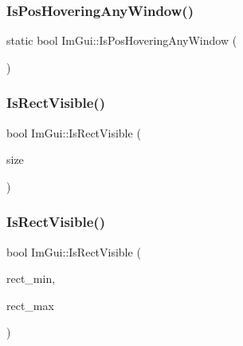 \subsubsection{\texorpdfstring{Is\+Pos\+Hovering\+Any\+Window()}{IsPosHoveringAnyWindow()}}
{\footnotesize\ttfamily static bool Im\+Gui\+::\+Is\+Pos\+Hovering\+Any\+Window (\begin{DoxyParamCaption}\item[{const \hyperlink{struct_im_vec2}{Im\+Vec2} \&}]{ }\end{DoxyParamCaption})\hspace{0.3cm}{\ttfamily [static]}}

\hypertarget{namespace_im_gui_a578ead6237b3ed05497ed361f18d9f97}{}\label{namespace_im_gui_a578ead6237b3ed05497ed361f18d9f97} 
\subsubsection{\texorpdfstring{Is\+Rect\+Visible()}{IsRectVisible()}\hspace{0.1cm}{\footnotesize\ttfamily [1/2]}}
{\footnotesize\ttfamily bool Im\+Gui\+::\+Is\+Rect\+Visible (\begin{DoxyParamCaption}\item[{const \hyperlink{struct_im_vec2}{Im\+Vec2} \&}]{size }\end{DoxyParamCaption})}

\hypertarget{namespace_im_gui_a5aca7e6939e07caaca489aa8c776fd81}{}\label{namespace_im_gui_a5aca7e6939e07caaca489aa8c776fd81} 
\subsubsection{\texorpdfstring{Is\+Rect\+Visible()}{IsRectVisible()}\hspace{0.1cm}{\footnotesize\ttfamily [2/2]}}
{\footnotesize\ttfamily bool Im\+Gui\+::\+Is\+Rect\+Visible (\begin{DoxyParamCaption}\item[{const \hyperlink{struct_im_vec2}{Im\+Vec2} \&}]{rect\+\_\+min,  }\item[{const \hyperlink{struct_im_vec2}{Im\+Vec2} \&}]{rect\+\_\+max }\end{DoxyParamCaption})}

\hypertarget{namespace_im_gui_abf8f15c7648d453142b0dc72bc5ed8ba}{}\label{namespace_im_gui_abf8f15c7648d453142b0dc72bc5ed8ba} 
